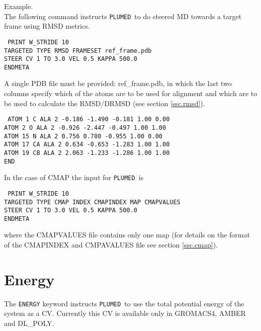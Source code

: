 \documentclass[12pt,fleqn]{report}
\newcommand{\keyword}[1]{\index{Keywords!{\tt #1}} {\tt #1}}
\newcommand{\plumed}{{\tt PLUMED}}
\newcommand{\esempio}[1]{
\vspace{10pt}
\begin{flushright}
\colorbox{light-gray}{
   \begin{minipage}{13cm}
       \scriptsize{
{\fontfamily{phv} \fontseries{b}
 \selectfont Example. \\
 \fontseries{m} \selectfont #1 } }
\end{minipage}}
\end{flushright}
\vspace{20pt}
}
\begin{document}
\esempio{The following command instructs \plumed \ to do steered MD towards a target frame 
 using RMSD metrics. 
 \vspace{10pt}

{\tt
PRINT W\_STRIDE 10\\
TARGETED TYPE RMSD FRAMESET ref\_frame.pdb  \\
STEER CV 1 TO 3.0 VEL 0.5 KAPPA 500.0\\
ENDMETA\\
}
 \vspace{10pt}

A single PDB file must be provided: ref\_frame.pdb, in which the 
last two columns specify which of the atoms are to be
used for alignment and which are to be used to calculate the RMSD/DRMSD (see section \ref{ssc.rmsd}).   \vspace{10pt}


{\tt
ATOM       1  C   ALA     2      -0.186  -1.490  -0.181  1.00  0.00 \\
ATOM       2  O   ALA     2      -0.926  -2.447  -0.497  1.00  1.00 \\
ATOM     15  N   ALA     2       0.756   0.780  -0.955  1.00  0.00 \\
ATOM     17  CA  ALA     2       0.634  -0.653  -1.283  1.00  1.00 \\
ATOM     19  CB  ALA     2       2.063  -1.233  -1.286  1.00  1.00\\
END }

 \vspace{10pt}
In the case of CMAP the input for \plumed \ is
 \vspace{10pt}

{\tt
PRINT W\_STRIDE 10\\
TARGETED TYPE CMAP INDEX CMAPINDEX MAP CMAPVALUES  \\
STEER CV 1 TO 3.0 VEL 0.5 KAPPA 500.0\\
ENDMETA\\
}
 \vspace{10pt}

where the CMAPVALUES file contains only one map (for details on the format of the CMAPINDEX and CMPAVALUES file see section \ref{ssc.cmap}).
}


\section{Energy}
The \keyword{ENERGY} keyword instructs \plumed \ to use the total potential energy of the system
\cite{li:094101,Michel:2009p17713,Donadio:2005p17962,Bonomi:2009p17935} as a CV. 
Currently this CV is available only in GROMACS4, AMBER and DL\_POLY.  
\end{document}
